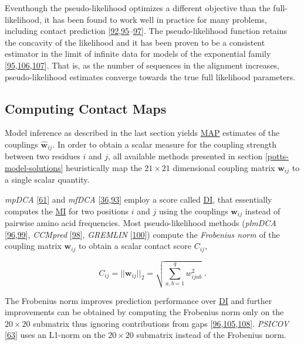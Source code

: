 \documentclass[11pt,a4paper,twoside]{book}
\newcommand{\w}{\mathbf{w}}
\newcommand{\wij}{\mathbf{w}_{ij}}
\newcommand{\wijab}{w_{ijab}}
\theoremstyle{definition}
\theoremstyle{definition}
\theoremstyle{remark}
\begin{document}
Eventhough the pseudo-likelihood optimizes a different objective than
the full-likelihood, it has been found to work well in practice for many
problems, including contact prediction
{[}\protect\hyperlink{ref-Murphy2012}{92},\protect\hyperlink{ref-Koller2009}{95}--\protect\hyperlink{ref-Stein2015a}{97}{]}.
The pseudo-likelihood function retains the concavity of the likelihood
and it has been proven to be a consistent estimator in the limit of
infinite data for models of the exponential family
{[}\protect\hyperlink{ref-Koller2009}{95},\protect\hyperlink{ref-Besag1975}{106},\protect\hyperlink{ref-Gidas1988}{107}{]}.
That is, as the number of sequences in the alignment increases,
pseudo-likelihood estimates converge towards the true full likelihood
parameters.

\subsection{Computing Contact Maps}\label{post-processing-heuristics}

Model inference as described in the last section yields
\protect\hyperlink{abbrev}{MAP} estimates of the couplings
\(\hat{\w}_{ij}\). In order to obtain a scalar measure for the coupling
strength between two residues \(i\) and \(j\), all available methods
presented in section \ref{potts-model-solutions} heuristically map the
\(21 \! \times \! 21\) dimensional coupling matrix \(\wij\) to a single
scalar quantity.

\emph{mpDCA} {[}\protect\hyperlink{ref-Weigt2009}{61}{]} and
\emph{mfDCA}
{[}\protect\hyperlink{ref-Marks2011}{36},\protect\hyperlink{ref-Morcos2011}{93}{]}
employ a score called \protect\hyperlink{abbrev}{DI}, that essentially
computes the \protect\hyperlink{abbrev}{MI} for two positions \(i\) and
\(j\) using the couplings \(\wij\) instead of pairwise amino acid
frequencies. Most pseudo-likelihood methods (\emph{plmDCA}
{[}\protect\hyperlink{ref-Ekeberg2013}{96},\protect\hyperlink{ref-Ekeberg2014}{99}{]},
\emph{CCMpred} {[}\protect\hyperlink{ref-Seemayer2014}{98}{]},
\emph{GREMLIN} {[}\protect\hyperlink{ref-Kamisetty2013}{100}{]}) compute
the \emph{Frobenius norm} of the coupling matrix \(\wij\) to obtain a
scalar contact score \(C_{ij}\),

\begin{equation}
    C_{ij}  = ||\wij||_2 = \sqrt{\sum_{a,b=1}^q \wijab^2} \; .
\label{eq:frobenius-norm}
\end{equation}

The Frobenius norm improves prediction performance over
\protect\hyperlink{abbrev}{DI} and further improvements can be obtained
by computing the Frobenius norm only on the \(20 \times 20\) submatrix
thus ignoring contributions from gaps
{[}\protect\hyperlink{ref-Ekeberg2013}{96},\protect\hyperlink{ref-Baldassi2014}{105},\protect\hyperlink{ref-Feinauer2014}{108}{]}.
\emph{PSICOV} {[}\protect\hyperlink{ref-Jones2012}{63}{]} uses an
L1-norm on the \(20 \times 20\) submatrix instead of the Frobenius norm.
\end{document}
